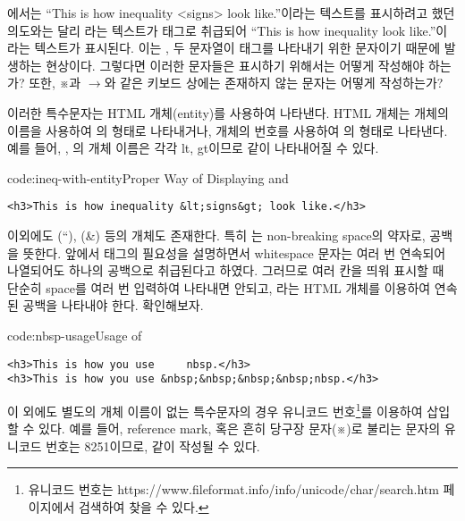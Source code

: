 에서는 ``This is how inequality {\textless}signs{\textgreater} look like.''이라는 텍스트를 표시하려고 했던 의도와는 달리 라는 텍스트가 태그로 취급되어 ``This is how inequality look like.''이라는 텍스트가 표시된다. 이는 \cd{<}, \cd{>} 두 문자열이 태그를 나타내기 위한 문자이기 때문에 발생하는 현상이다. 그렇다면 이러한 문자들은 표시하기 위해서는 어떻게 작성해야 하는가? 또한, ※과 $\rightarrow$와 같은 키보드 상에는 존재하지 않는 문자는 어떻게 작성하는가?

이러한 특수문자는 HTML 개체(entity)를 사용하여 나타낸다. HTML 개체는 개체의 이름을 사용하여 의 형태로 나타내거나, 개체의 번호를 사용하여 의 형태로 나타낸다. 예를 들어, \cd{<}, \cd{>}의 개체 이름은 각각 lt, gt이므로 \는 \와 같이 나타내어질 수 있다.

\begin{codeenv}{code:ineq-with-entity}{Proper Way of Displaying \cd{<} and \cd{>}}\begin{verbatim}
<h3>This is how inequality &lt;signs&gt; look like.</h3>
\end{verbatim}
\end{codeenv}

이외에도 (``), (\&) 등의 개체도 존재한다. 특히 는 non-breaking space의 약자로, 공백을 뜻한다. 앞에서  태그의 필요성을 설명하면서 whitespace 문자는 여러 번 연속되어 나열되어도 하나의 공백으로 취급된다고 하였다. 그러므로 여러 칸을 띄워 표시할 때 단순히 space를 여러 번 입력하여 나타내면 안되고, 라는 HTML 개체를 이용하여 연속된 공백을 나타내야 한다. \를 확인해보자.

\begin{codeenv}{code:nbsp-usage}{Usage of }\begin{verbatim}
<h3>This is how you use     nbsp.</h3>
<h3>This is how you use &nbsp;&nbsp;&nbsp;&nbsp;nbsp.</h3>
\end{verbatim}
\end{codeenv}

이 외에도 별도의 개체 이름이 없는 특수문자의 경우 유니코드 번호\footnote{유니코드 번호는 https://www.fileformat.info/info/unicode/char/search.htm 페이지에서 검색하여 찾을 수 있다.}를 이용하여 삽입할 수 있다. 예를 들어, reference mark, 혹은 흔히 당구장 문자(※)로 불리는 문자의 유니코드 번호는 8251이므로, \와 같이 작성될 수 있다.

